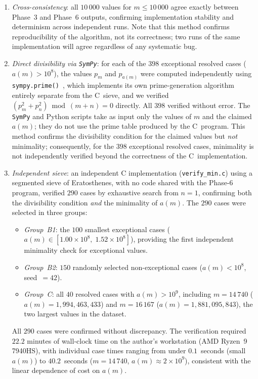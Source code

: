\documentclass[12pt]{article}
\begin{document}
	\begin{enumerate}
		\item \emph{Cross-consistency}: all $10\,000$ values for
		$m \leq 10\,000$ agree exactly between Phase~3 and Phase~6 outputs,
		confirming implementation stability and determinism across
		independent runs.
		Note that this method confirms reproducibility of the algorithm,
		not its correctness; two runs of the same implementation will
		agree regardless of any systematic bug.
		\item \emph{Direct divisibility via \texttt{SymPy}}: for each of the
		$398$ exceptional resolved cases ($a(m) > 10^8$), the values $p_m$
		and $p_{a(m)}$ were computed independently using
		\texttt{sympy.prime()}~\cite{SymPy}, which implements its own
		prime-generation algorithm entirely separate from the C~sieve, and
		we verified $(p_m^2 + p_n^2) \bmod (m+n) = 0$ directly.
		All $398$ verified without error.
		The \texttt{SymPy} and Python scripts take as input only the values
		of $m$ and the claimed $a(m)$; they do not use the prime table
		produced by the C~program.
		This method confirms the divisibility condition for the claimed
		values but \emph{not} minimality; consequently, for the $398$
		exceptional resolved cases, minimality is not independently
		verified beyond the correctness of the C~implementation.
		\item \emph{Independent sieve}: an independent C implementation
		(\texttt{verify\_min.c}) using a segmented sieve of Eratosthenes,
		with no code shared with the Phase-6 program, verified $290$ cases
		by exhaustive search from $n = 1$, confirming both the divisibility
		condition \emph{and} the minimality of $a(m)$.
		The $290$ cases were selected in three groups:
		\begin{itemize}
			\item \emph{Group~B1}: the $100$ smallest exceptional cases
			($a(m) \in [1.00 \times 10^8,\; 1.52 \times 10^8]$), providing
			the first independent minimality check for exceptional values.
			\item \emph{Group~B2}: $150$ randomly selected non-exceptional
			cases ($a(m) < 10^8$, seed~$= 42$).
			\item \emph{Group~C}: all $40$ resolved cases with
			$a(m) > 10^9$, including $m = 14\,740$
			($a(m) = 1{,}994{,}463{,}433$) and $m = 16\,167$
			($a(m) = 1{,}881{,}095{,}843$), the two largest values in the
			dataset.
		\end{itemize}
		All $290$ cases were confirmed without discrepancy.
		The verification required $22.2$ minutes of wall-clock time on the
		author's workstation (AMD Ryzen~9 7940HS), with individual case
		times ranging from under $0.1$~seconds (small $a(m)$) to
		$40.2$~seconds ($m = 14\,740$, $a(m) \approx 2 \times 10^9$),
		consistent with the linear dependence of cost on $a(m)$.
	\end{enumerate}
	
\end{document}
